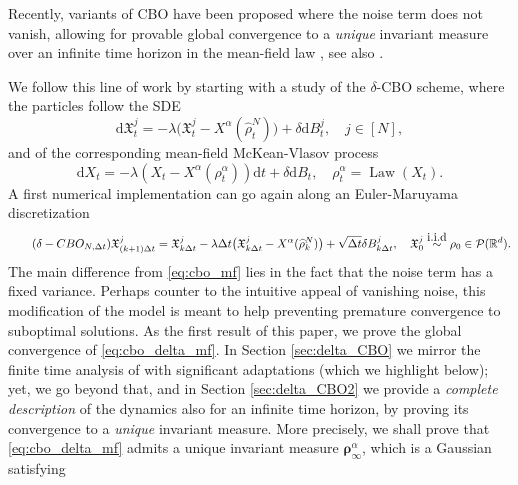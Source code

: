 \documentclass[reqno]{amsart}
\numberwithin{algorithm}{section}
\newcommand{\diff}{\mathrm{d}}
\newcommand{\Xalpha}{{X^\alpha}}
\newcommand{\Xf}{{\mathfrak{X}}}
\begin{document}
{Recently, variants of CBO have been proposed where the noise term does not vanish, allowing for provable global convergence to a {\it unique} invariant measure over an infinite time horizon in the mean-field law \cite{huang2025faithful,huang2025uniform}, see also \cite{bianchi2025}. 

We follow this line of work by starting with a study of the $\delta$-CBO scheme, where the particles follow the SDE
\begin{equation}\tag{$\delta$-CBO$_N$}\label{eq:cbo_delta_finite}
    \diff \Xf_t^j = -\lambda \big(\Xf_t^j -  \Xalpha(\widehat\rho^N_t)\big) + \delta \diff B_t^j, \quad j \in [N],
\end{equation}
and of the corresponding mean-field McKean-Vlasov process
\begin{equation}\tag{$\delta$-CBO}\label{eq:cbo_delta_mf}
    \diff X_t = -\lambda(X_t - \Xalpha(\rho^\alpha_t)) \diff t + \delta \diff B_t, \quad \rho^\alpha_t=\operatorname{Law}(X_t).\end{equation}
A first numerical implementation can go again along an Euler-Maruyama discretization
\begin{equation}\tag{$\delta-CBO_{N,\Delta t}$}\label{eq:delta-cbo_finite_discrete}
 \Xf_{(k+1)\Delta t}^j =\Xf_{k \Delta t}^j -\lambda \Delta t \big(\Xf_{k \Delta t}^j -  \Xalpha(\widehat\rho^N_k)\big) + \sqrt{\Delta t} \delta  B_{k \Delta t}^j, \quad \Xf_{0}^j \overset{\mbox{i.i.d}}{\sim} \rho_0 \in \mathcal P(\mathbb R^d).
\end{equation}
 The main difference from \eqref{eq:cbo_mf} lies in the fact that the noise term has a fixed variance. Perhaps counter to the intuitive appeal of vanishing noise, this modification of the model is meant to help preventing premature convergence to suboptimal solutions.
As the first result of this paper, we prove the global convergence of \eqref{eq:cbo_delta_mf}. In Section \ref{sec:delta_CBO} we mirror the finite time analysis of \cite{B1-fornasier2021global} with significant adaptations (which we highlight below); yet, we go beyond that, and in Section \ref{sec:delta_CBO2} we provide a {\it complete description} of the dynamics also for an infinite time horizon, by proving its convergence to a {\it unique} invariant measure. {More precisely, we shall prove that \eqref{eq:cbo_delta_mf} admits a unique invariant measure $\boldsymbol\rho_\infty^\alpha$, which is a Gaussian satisfying
}}
\end{document}
